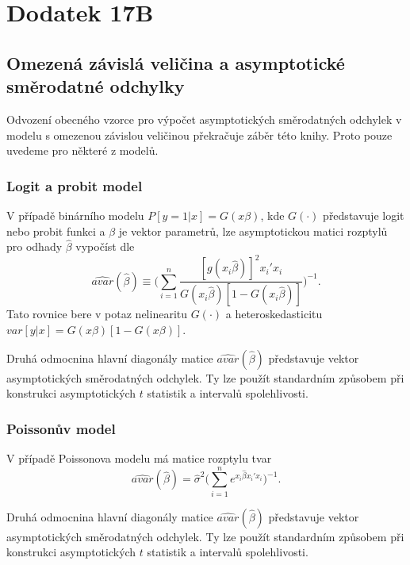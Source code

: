 \section{Dodatek 17B}

\subsection{Omezená závislá veličina a asymptotické směrodatné odchylky}

Odvození obecného vzorce pro výpočet asymptotických směrodatných odchylek v modelu s omezenou závislou veličinou překračuje záběr této knihy. Proto pouze uvedeme pro některé z modelů.

\subsubsection{Logit a probit model}

V případě binárního modelu $P[y = 1|x] = G(x \beta)$, kde $G(\cdot)$ představuje logit nebo probit funkci a $\beta$ je vektor parametrů, lze asymptotickou matici rozptylů pro odhady $\hat{\beta}$ vypočíst dle
\begin{equation}
\widehat{avar}(\hat{\beta}) \equiv \Big(\sum_{i = 1}^n \frac{[g(x_i \hat{\beta})]^2 x_i'x_i}{G(x_i \hat{\beta})[1 - G(x_i \hat{\beta})]}\Big)^{-1}.
\end{equation}
Tato rovnice bere v potaz nelinearitu $G(\cdot)$ a heteroskedasticitu $var[y|x] = G(x \beta)[1 - G(x \beta)]$.

Druhá odmocnina hlavní diagonály matice $\widehat{avar}(\hat{\beta})$ představuje vektor asymptotických směrodatných odchylek. Ty lze použít standardním způsobem při konstrukci asymptotických $t$ statistik a intervalů spolehlivosti.

\subsubsection{Poissonův model}

V případě Poissonova modelu má matice rozptylu tvar
\begin{equation}
\widehat{avar}(\hat{\beta}) = \hat{\sigma}^2 \Big(\sum_{i = 1}^n e^{x_i \hat{\beta}x_i'x_i}\Big)^{-1}.
\end{equation}

Druhá odmocnina hlavní diagonály matice $\widehat{avar}(\hat{\beta})$ představuje vektor asymptotických směrodatných odchylek. Ty lze použít standardním způsobem při konstrukci asymptotických $t$ statistik a intervalů spolehlivosti.